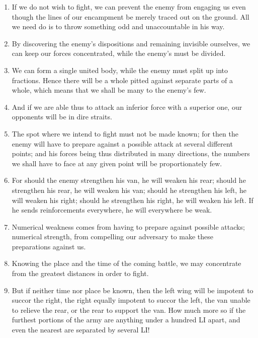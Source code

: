 \begin{enumerate}
  \item If we do not wish to fight, we can prevent the enemy from
    engaging us even though the lines of our encampment be merely
    traced out on the ground. All we need do is to throw something odd
    and unaccountable in his way.

  \item By discovering the enemy's dispositions and remaining
    invisible ourselves, we can keep our forces concentrated, while
    the enemy's must be divided.

  \item We can form a single united body, while the enemy must split
    up into fractions. Hence there will be a whole pitted against
    separate parts of a whole, which means that we shall be many to
    the enemy's few.

  \item And if we are able thus to attack an inferior force with a
    superior one, our opponents will be in dire straits.

  \item The spot where we intend to fight must not be made known; for
    then the enemy will have to prepare against a possible attack at
    several different points; and his forces being thus distributed in
    many directions, the numbers we shall have to face at any given
    point will be proportionately few.

  \item For should the enemy strengthen his van, he will weaken his
    rear; should he strengthen his rear, he will weaken his van;
    should he strengthen his left, he will weaken his right; should he
    strengthen his right, he will weaken his left. If he sends
    reinforcements everywhere, he will everywhere be weak.

  \item Numerical weakness comes from having to prepare against
    possible attacks; numerical strength, from compelling our
    adversary to make these preparations against us.

  \item Knowing the place and the time of the coming battle, we may
    concentrate from the greatest distances in order to fight.

  \item But if neither time nor place be known, then the left wing
    will be impotent to succor the right, the right equally impotent
    to succor the left, the van unable to relieve the rear, or the
    rear to support the van. How much more so if the furthest portions
    of the army are anything under a hundred LI apart, and even the
    nearest are separated by several LI!


\end{enumerate}
